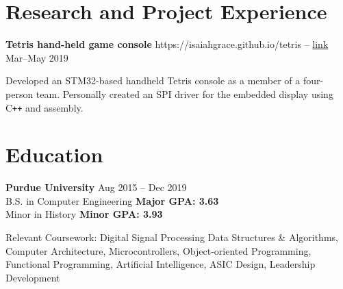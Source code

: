 \documentclass[10pt,letterpaper]{article}
\newcommand{\resumeItem}[4]{
	\begingroup
	\def\link{#2}
	\textbf{#1}
	\ifx\link\empty \else 
		-- \href{#2}{link}
	\fi
	\hfill #3\\
	\begin{adjustwidth}{15pt}{}
	#4
	\end{adjustwidth}
	\endgroup
}
\begin{document}
\section*{Research and Project Experience}

\resumeItem
{Tetris hand-held game console}
{https://isaiahgrace.github.io/tetris}
{Mar--May 2019}
{Developed an STM32-based handheld Tetris console as a member of a four-person team. Personally created an SPI driver for the embedded display using C\texttt{++} and assembly.}


\section*{Education}
\textbf{Purdue University} \hfill Aug 2015 -- Dec 2019 \\
B.S. in Computer Engineering \textbf{Major GPA: 3.63} \\
Minor in History \textbf{Minor GPA: 3.93}

\vspace{2pt}
Relevant Coursework:
Digital Signal Processing
Data Structures \& Algorithms,
Computer Architecture,
Microcontrollers,
Object-oriented Programming,
Functional Programming,
Artificial Intelligence,
ASIC Design,
Leadership Development
\end{document}
